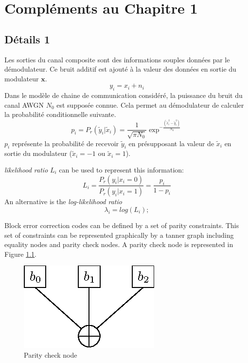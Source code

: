 
\appendix

\chapter{Compléments au Chapitre 1}
\section{Détails 1}\label{append:decoding_nodes}

Les sorties du canal composite sont des informations souples données par le démodulateur.
Ce bruit additif est ajouté à la valeur des données en sortie du modulateur $\mathbold{x}$.
\begin{equation}
y_i = x_i + n_i
\end{equation}
Dans le modèle de chaine de communication considéré, la puissance du bruit du canal AWGN $N_0$ est supposée connue.
Cela permet au démodulateur de calculer la probabilité conditionnelle suivante.
\begin{equation}
	p_i = P_r( \tilde{y}_i|\tilde{x}_i) = \frac{1}{\sqrt{\pi N_0}}\exp^{-\frac{(\tilde{x}_i^2-\tilde{y}_i^2)}{N_0}}
\end{equation}
$p_i$ représente la probabilité de recevoir $\tilde{y}_i$ en présupposant la valeur de $\tilde{x}_i$ en sortie du modulateur ($\tilde{x}_i=-1$ ou $\tilde{x}_i=1$).


\textit{likelihood ratio} $L_i$ can be used to represent this information: 
\begin{equation}
	L_i = \dfrac{P_r(y_i | x_i = 0)}{P_r(y_i | x_i = 1)} = \dfrac{p_i}{1 - p_i}
	\label{eq:lr}
\end{equation}
An alternative is the \textit{log-likelihood ratio}
\begin{equation}
	\lambda_i = log(L_i);
	\label{eq:llr}
\end{equation}

Block error correction codes can be defined by a set of parity constraints. This set of constraints can be represented graphically by a tanner graph including equality nodes and parity check nodes. A parity check node is represented in Figure \ref{fig:parite}.

\begin{figure}[t]
\centering
\includegraphics{tail/appendix_1_fig/parite3}
\caption{Parity check node}
\label{fig:parite}
\end{figure}

